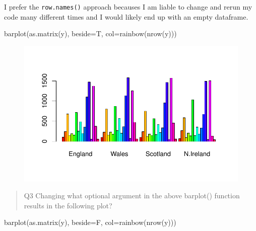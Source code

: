 \documentclass[
  letterpaper,
  DIV=11,
  numbers=noendperiod]{scrartcl}
\newenvironment{Shaded}{\begin{snugshade}}{\end{snugshade}}
\newcommand{\AttributeTok}[1]{\textcolor[rgb]{0.40,0.45,0.13}{#1}}
\newcommand{\FunctionTok}[1]{\textcolor[rgb]{0.28,0.35,0.67}{#1}}
\newcommand{\NormalTok}[1]{\textcolor[rgb]{0.00,0.23,0.31}{#1}}
\begin{document}
I prefer the \texttt{row.names()} approach becauses I am liable to
change and rerun my code many different times and I would likely end up
with an empty dataframe.

\begin{Shaded}
\begin{Highlighting}[]
\FunctionTok{barplot}\NormalTok{(}\FunctionTok{as.matrix}\NormalTok{(y), }\AttributeTok{beside=}\NormalTok{T, }\AttributeTok{col=}\FunctionTok{rainbow}\NormalTok{(}\FunctionTok{nrow}\NormalTok{(y)))}
\end{Highlighting}
\end{Shaded}

\begin{figure}[H]

{\centering \includegraphics{Class07_files/figure-pdf/unnamed-chunk-16-1.pdf}

}

\end{figure}

\begin{quote}
Q3 Changing what optional argument in the above barplot() function
results in the following plot?
\end{quote}

\begin{Shaded}
\begin{Highlighting}[]
\FunctionTok{barplot}\NormalTok{(}\FunctionTok{as.matrix}\NormalTok{(y), }\AttributeTok{beside=}\NormalTok{F, }\AttributeTok{col=}\FunctionTok{rainbow}\NormalTok{(}\FunctionTok{nrow}\NormalTok{(y)))}
\end{Highlighting}
\end{Shaded}
\end{document}
